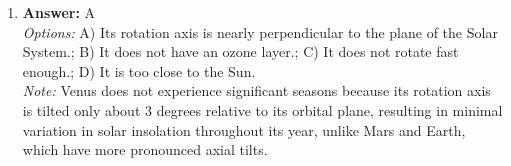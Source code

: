 \documentclass[12pt]{article}
\begin{document}
\begin{enumerate}[label=\arabic*.]
\\ \textit{Note:} Planetary rings are primarily formed from the debris created when small moons are shattered by collisions with other celestial bodies, resulting in the accumulation of particles that orbit the planet.
\item \textbf{Answer:} A
\\ \textit{Options:} A) Its rotation axis is nearly perpendicular to the plane of the Solar System.; B) It does not have an ozone layer.; C) It does not rotate fast enough.; D) It is too close to the Sun.
\\ \textit{Note:} Venus does not experience significant seasons because its rotation axis is tilted only about 3 degrees relative to its orbital plane, resulting in minimal variation in solar insolation throughout its year, unlike Mars and Earth, which have more pronounced axial tilts.
\end{enumerate}
\end{document}
